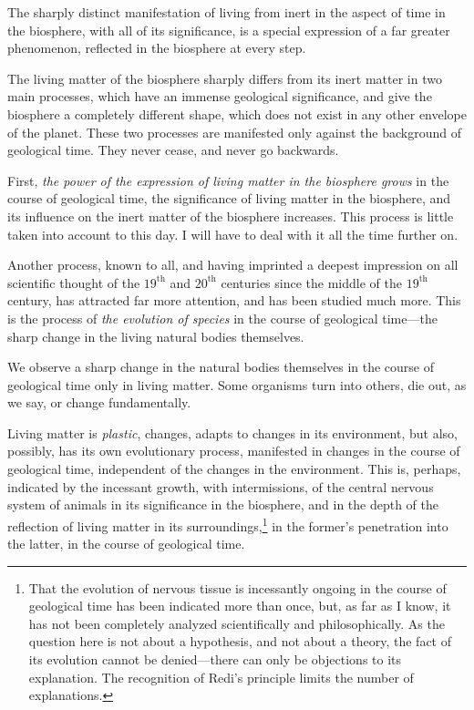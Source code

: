 The sharply distinct manifestation of living from inert in the aspect of time
in the biosphere, with all of its significance, is a special expression of a
far greater phenomenon, reflected in the biosphere at every step.


\Section \label{sec:8}%
The living matter of the biosphere sharply differs from its inert matter in two
main processes, which have an immense geological significance, and give the
biosphere a completely different shape, which does not exist in any other
envelope of the planet.  These two processes are manifested only against the
background of geological time.  They never cease, and never go backwards.

First, \emph{the power of the expression of living matter in the biosphere
grows} in the course of geological time, the significance of living matter in
the biosphere, and its influence on the inert matter of the biosphere
increases.  This process is little taken into account to this day.  I will have
to deal with it all the time further on.

Another process, known to all, and having imprinted a deepest impression on all
scientific thought of the $19^\mathrm{th}$ and $20^\mathrm{th}$ centuries since
the middle of the $19^\mathrm{th}$ century, has attracted far more attention,
and has been studied much more.  This is the process of \emph{the evolution of
species} in the course of geological time---the sharp change in the living
natural bodies themselves.

We observe a sharp change in the natural bodies themselves in the course of
geological time only in living matter.  Some organisms turn into others, die
out, as we say, or change fundamentally.

Living matter is \emph{plastic}, changes, adapts to changes in its environment,
but also, possibly, has its own evolutionary process, manifested in changes in
the course of geological time, independent of the changes in the environment.
This is, perhaps, indicated by the incessant growth, with intermissions, of the
central nervous system of animals in its significance in the biosphere, and in
the depth of the reflection of living matter in its surroundings,\footnote{
	That the evolution of nervous tissue is incessantly ongoing in the
	course of geological time has been indicated more than once, but, as
	far as I know, it has not been completely analyzed scientifically and
	philosophically.  As the question here is not about a hypothesis, and
	not about a theory, the fact of its evolution cannot be denied---there
	can only be objections to its explanation.  The recognition of Redi's
	principle limits the number of explanations.
} in the former's penetration into the latter, in the course of geological
time.

